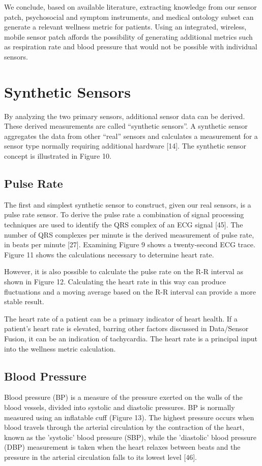 We conclude, based on available literature, extracting knowledge from our sensor patch, psychosocial and symptom instruments, and medical ontology subset can generate a relevant wellness metric for patients. Using an integrated, wireless, mobile sensor patch affords the possibility of generating additional metrics such as respiration rate and blood pressure that would not be possible with individual sensors.

\section{Synthetic Sensors}
By analyzing the two primary sensors, additional sensor data can be derived.  These derived measurements are called “synthetic sensors”. A synthetic sensor aggregates the data from other “real” sensors and calculates a measurement for a sensor type normally requiring additional hardware [14]. The synthetic sensor concept is illustrated in Figure 10.

\subsection{Pulse Rate}
The first and simplest synthetic sensor to construct, given our real sensors, is a pulse rate sensor. To derive the pulse rate a combination of signal processing techniques are used to identify the QRS complex of an ECG signal [45]. The number of QRS complexes per minute is the derived measurement of pulse rate, in beats per minute [27]. Examining Figure 9 shows a twenty-second ECG trace. Figure 11 shows the calculations necessary to determine heart rate.

However, it is also possible to calculate the pulse rate on the R-R interval as shown in Figure 12. Calculating the heart rate in this way can produce fluctuations and a moving average based on the R-R interval can provide a more stable result.

The heart rate of a patient can be a primary indicator of heart health. If a patient’s heart rate is elevated, barring other factors discussed in Data/Sensor Fusion, it can be an indication of tachycardia. The heart rate is a principal input into the wellness metric calculation.

\subsection{Blood Pressure}
Blood pressure (BP) is a measure of the pressure exerted on the walls of the blood vessels, divided into systolic and diastolic pressures. BP is normally measured using an inflatable cuff (Figure 13). The highest pressure occurs when blood travels through the arterial circulation by the contraction of the heart,  known as the 'systolic' blood pressure (SBP), while the 'diastolic' blood pressure (DBP) measurement is taken when the heart relaxes between beats and the pressure in the arterial circulation falls to its lowest level [46]. 


